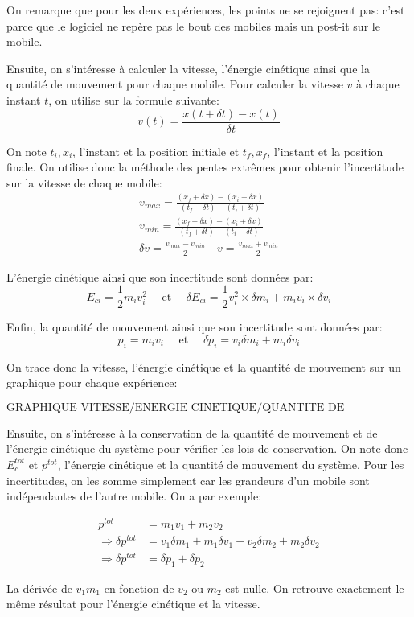 \documentclass[12pt]{article}
\begin{document}
On remarque que pour les deux expériences, les points ne se rejoignent pas: c'est parce que le logiciel ne repère pas le bout des mobiles mais un post-it sur le mobile.  

Ensuite, on s'intéresse à calculer la vitesse, l'énergie cinétique ainsi que la quantité de mouvement
pour chaque mobile.
Pour calculer la vitesse $v$ à chaque instant $t$, on utilise sur la formule suivante:
\begin{equation}
    v(t) = \frac{x(t + \delta t) - x(t)}{\delta t}
\end{equation}

On note $t_i, x_i$, l'instant et la position initiale et $t_f, x_f$, l'instant et la position finale. On utilise donc la méthode
des pentes extrêmes pour obtenir l'incertitude sur la vitesse de chaque mobile:
\begin{gather*}
    v_{max} = \frac{(x_f + \delta x) - (x_i - \delta x)}{(t_f - \delta t) - (t_i + \delta t)} \\
    v_{min} = \frac{(x_f - \delta x) - (x_i + \delta x)}{(t_f + \delta t) - (t_i - \delta t)} \\
    \delta v = \frac{v_{max} - v_{min}}{2} \quad v = \frac{v_{max} + v_{min}}{2}
\end{gather*}

L'énergie cinétique ainsi que son incertitude sont données par:
\begin{equation}
    E_{ci} = \frac{1}{2}m_iv_i^2 \quad \text{ et } \quad \delta E_{ci} = \frac{1}{2}v_i^2 \times \delta m_i + m_iv_i \times \delta v_i
\end{equation}

Enfin, la quantité de mouvement ainsi que son incertitude sont données par:
\begin{equation}
    p_i = m_iv_i \quad \text{ et } \quad \delta p_i = v_i\delta m_i + m_i\delta v_i
\end{equation}

On trace donc la vitesse, l'énergie cinétique et la quantité de mouvement sur un graphique pour chaque expérience:

\[
    \text{GRAPHIQUE VITESSE/ENERGIE CINETIQUE/QUANTITE DE MOUVEMENT}
\]

\newpage
Ensuite, on s'intéresse à la conservation de la quantité de mouvement et de l'énergie cinétique du système pour
vérifier les lois de conservation. On note donc $E_c^{tot}$ et $p^{tot}$, l'énergie cinétique et la quantité de mouvement du système. 
Pour les incertitudes, on les somme simplement car les grandeurs d'un mobile sont indépendantes de l'autre mobile. On a par exemple:

\begin{align}
    p^{tot} & = m_1v_1 + m_2v_2 \\
    \Rightarrow \delta p^{tot} & = v_1\delta m_1 + m_1\delta v_1 + v_2\delta m_2 + m_2\delta v_2 \\
    \Rightarrow \delta p^{tot} & = \delta p_1 + \delta p_2
\end{align}

La dérivée de $v_1m_1$ en fonction de $v_2$ ou $m_2$ est nulle. On retrouve exactement le même résultat pour l'énergie cinétique et la vitesse.
\end{document}
